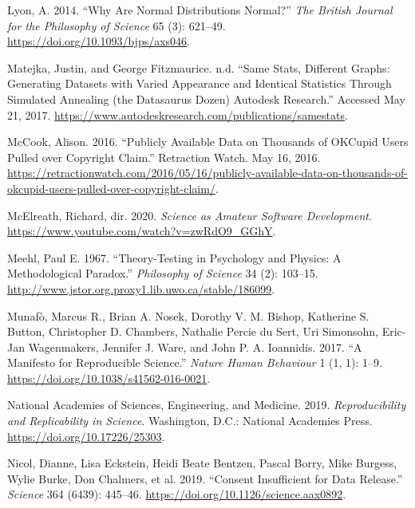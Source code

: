 \documentclass[
]{article}
\newlength{\cslhangindent}
\newenvironment{cslreferences}%
  {\setlength{\parindent}{0pt}%
  \everypar{\setlength{\hangindent}{\cslhangindent}}\ignorespaces}%
  {\par}
\begin{document}
\begin{cslreferences}
\leavevmode\hypertarget{ref-LyonWhyAreNormal2014}{}%
Lyon, A. 2014. ``Why Are Normal Distributions Normal?'' \emph{The British Journal for the Philosophy of Science} 65 (3): 621--49. \url{https://doi.org/10.1093/bjps/axs046}.

\leavevmode\hypertarget{ref-MatejkaSameStatsDifferent}{}%
Matejka, Justin, and George Fitzmaurice. n.d. ``Same Stats, Different Graphs: Generating Datasets with Varied Appearance and Identical Statistics Through Simulated Annealing (the Datasaurus Dozen) \textbar{} Autodesk Research.'' Accessed May 21, 2017. \url{https://www.autodeskresearch.com/publications/samestats}.

\leavevmode\hypertarget{ref-McCookPubliclyAvailableData2016}{}%
McCook, Alison. 2016. ``Publicly Available Data on Thousands of OKCupid Users Pulled over Copyright Claim.'' Retraction Watch. May 16, 2016. \url{https://retractionwatch.com/2016/05/16/publicly-available-data-on-thousands-of-okcupid-users-pulled-over-copyright-claim/}.

\leavevmode\hypertarget{ref-McElreathScienceAmateurSoftware2020}{}%
McElreath, Richard, dir. 2020. \emph{Science as Amateur Software Development}. \url{https://www.youtube.com/watch?v=zwRdO9_GGhY}.

\leavevmode\hypertarget{ref-MeehlTheoryTestingPsychologyPhysics1967}{}%
Meehl, Paul E. 1967. ``Theory-Testing in Psychology and Physics: A Methodological Paradox.'' \emph{Philosophy of Science} 34 (2): 103--15. \url{http://www.jstor.org.proxy1.lib.uwo.ca/stable/186099}.

\leavevmode\hypertarget{ref-MunafoManifestoReproducibleScience2017}{}%
Munafò, Marcus R., Brian A. Nosek, Dorothy V. M. Bishop, Katherine S. Button, Christopher D. Chambers, Nathalie Percie du Sert, Uri Simonsohn, Eric-Jan Wagenmakers, Jennifer J. Ware, and John P. A. Ioannidis. 2017. ``A Manifesto for Reproducible Science.'' \emph{Nature Human Behaviour} 1 (1, 1): 1--9. \url{https://doi.org/10.1038/s41562-016-0021}.

\leavevmode\hypertarget{ref-NationalAcademiesofSciencesEngineeringandMedicineReproducibilityReplicabilityScience2019}{}%
National Academies of Sciences, Engineering, and Medicine. 2019. \emph{Reproducibility and Replicability in Science}. Washington, D.C.: National Academies Press. \url{https://doi.org/10.17226/25303}.

\leavevmode\hypertarget{ref-NicolConsentInsufficientData2019}{}%
Nicol, Dianne, Lisa Eckstein, Heidi Beate Bentzen, Pascal Borry, Mike Burgess, Wylie Burke, Don Chalmers, et al. 2019. ``Consent Insufficient for Data Release.'' \emph{Science} 364 (6439): 445--46. \url{https://doi.org/10.1126/science.aax0892}.


\end{cslreferences}
\end{document}
